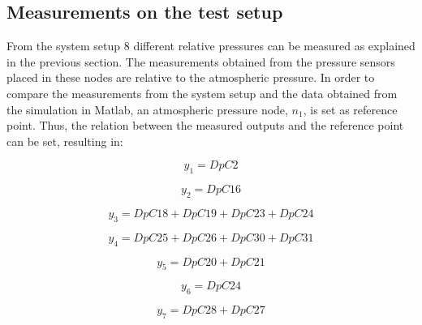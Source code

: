 \subsection{Measurements on the test setup}

From the system setup $8$ different relative pressures can be measured as explained in the previous section. The measurements obtained from the pressure sensors 
placed in these nodes are relative to the atmospheric pressure. In order to compare the measurements from the system setup and the data 
obtained from the simulation in Matlab, an atmospheric pressure node, $n_1$, is set as reference point. Thus, the relation between the measured 
outputs and the reference point can be set, resulting in:

\vspace{4mm}
\begin{equation}
    y_1 = DpC2 
\end{equation}

\vspace{4mm}
\begin{equation}
   y_2 = DpC16 
 \end{equation}

\vspace{4mm}
\begin {equation}
    y_3 = DpC18 + DpC19 + DpC23 + DpC24 
\end{equation}

\vspace{4mm}
\begin {equation}
    y_4 = DpC25 + DpC26 + DpC30 + DpC31 
\end{equation}

\vspace{4mm}
\begin {equation}
    y_5 = DpC20 + DpC21
\end{equation}

\vspace{4mm}
\begin {equation}
    y_6 = DpC24 
\end{equation}

\vspace{4mm}
\begin {equation}
   y_7 = DpC28 + DpC27
\end{equation}

